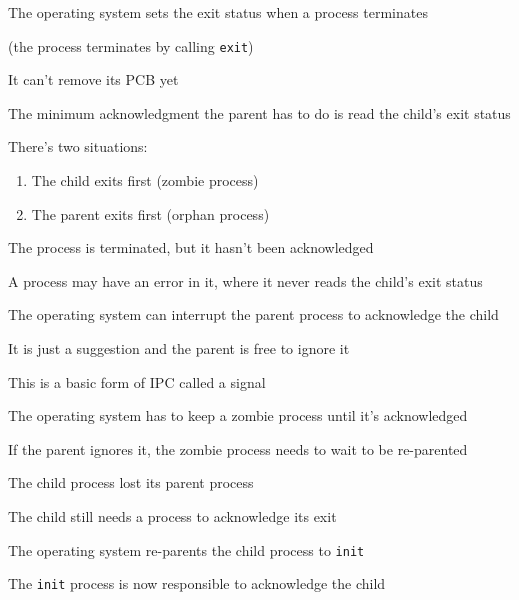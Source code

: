     \begin{slide}


        The operating system sets the exit status when a process terminates

        (the process terminates by calling \texttt{exit})

        \leftspace{}It can't remove its PCB yet
        \bigskip

        The minimum acknowledgment the parent has to do is read the child's exit status
        \bigskip

        There's two situations:
        \begin{enumerate}
          \item The child exits first (zombie process)
          \item The parent exits first (orphan process)
        \end{enumerate}

    \end{slide}

    \begin{slide}


        The process is terminated, but it hasn't been acknowledged
        \medskip

        A process may have an error in it, where it never reads the child's exit status
        \medskip

        The operating system can interrupt the parent process to acknowledge the child

        \leftspace{}It is just a suggestion and the parent is free to ignore it

        \leftspace{}\leftspace{}This is a basic form of IPC called a signal
        \bigskip

        The operating system has to keep a zombie process until it's acknowledged

        \leftspace{}If the parent ignores it, the zombie process needs to wait to
        be re-parented
        
    \end{slide}

    \begin{slide}


        The child process lost its parent process

        \leftspace{}The child still needs a process to acknowledge its exit
        \medskip

        The operating system re-parents the child process to \texttt{init}

        \leftspace{}The \texttt{init} process is now responsible to acknowledge the
                     child
                     
    \end{slide}

